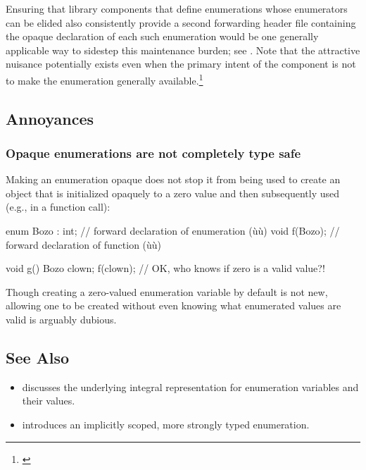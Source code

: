 Ensuring that library components that define
enumerations whose
enumerators can be elided also consistently provide a second
forwarding header file containing the opaque declaration of each such
enumeration would be one generally applicable way to sidestep this maintenance burden; see . Note that the attractive
nuisance potentially exists even when the primary intent of the component is not to make the enumeration generally
available.\footnote{\cite{wight}}

\subsection[Annoyances]{Annoyances}\label{annoyances}

\subsubsection[Opaque enumerations are not completely type safe]{Opaque enumerations are not completely type safe}\label{opaque-enumerations-are-not-completely-type-safe}

Making an enumeration opaque does not stop it from being used to create
an object that is initialized opaquely to a zero value and then
subsequently used (e.g., in a function call):

\begin{emcppslisting}
enum Bozo : int;  // forward declaration of enumeration (ù{}ù)
void f(Bozo);     // forward declaration of function (ù{}ù)

void g()
{
    Bozo clown{};
    f(clown);      // OK, who knows if zero is a valid value?!
}
\end{emcppslisting}

\noindent Though creating a zero-valued enumeration variable by default is not
new, allowing one to be created without even knowing what enumerated
values are valid is arguably dubious.

\subsection[See Also]{See Also}\label{see-also}

\begin{itemize}
\item{discusses the underlying integral representation for enumeration variables and their values.}
\item{introduces an implicitly scoped, more strongly typed enumeration.}
\end{itemize}

